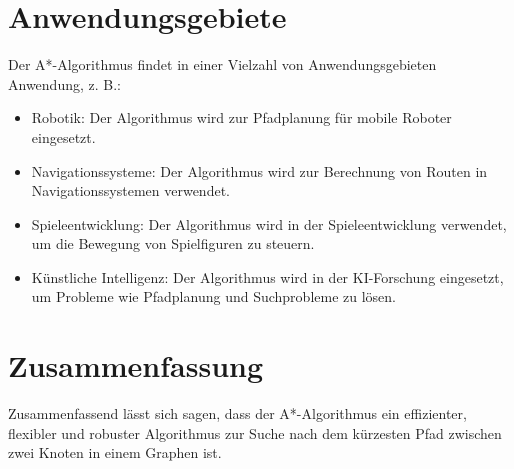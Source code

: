 \section{Anwendungsgebiete}

Der A*-Algorithmus findet in einer Vielzahl von Anwendungsgebieten Anwendung, z. B.:

\begin{itemize}
\item Robotik: Der Algorithmus wird zur Pfadplanung für mobile Roboter eingesetzt.
\item Navigationssysteme: Der Algorithmus wird zur Berechnung von Routen in Navigationssystemen verwendet.
\item Spieleentwicklung: Der Algorithmus wird in der Spieleentwicklung verwendet, um die Bewegung von Spielfiguren zu steuern.
\item Künstliche Intelligenz: Der Algorithmus wird in der KI-Forschung eingesetzt, um Probleme wie Pfadplanung und Suchprobleme zu lösen.
\end{itemize}

\section{Zusammenfassung}

Zusammenfassend lässt sich sagen, dass der A*-Algorithmus ein effizienter, flexibler und robuster Algorithmus zur Suche nach dem kürzesten Pfad zwischen zwei Knoten in einem Graphen ist.

